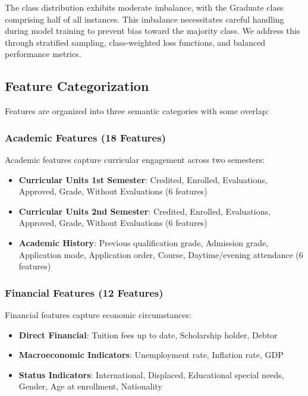 \documentclass[journal]{IEEEtran}
\begin{document}
The class distribution exhibits moderate imbalance, with the Graduate class comprising half of all instances. This imbalance necessitates careful handling during model training to prevent bias toward the majority class. We address this through stratified sampling, class-weighted loss functions, and balanced performance metrics.

\subsection{Feature Categorization}

Features are organized into three semantic categories with some overlap:

\subsubsection{Academic Features (18 Features)}

Academic features capture curricular engagement across two semesters:

\begin{itemize}
\item \textbf{Curricular Units 1st Semester}: Credited, Enrolled, Evaluations, Approved, Grade, Without Evaluations (6 features)
\item \textbf{Curricular Units 2nd Semester}: Credited, Enrolled, Evaluations, Approved, Grade, Without Evaluations (6 features)
\item \textbf{Academic History}: Previous qualification grade, Admission grade, Application mode, Application order, Course, Daytime/evening attendance (6 features)
\end{itemize}

\subsubsection{Financial Features (12 Features)}

Financial features capture economic circumstances:

\begin{itemize}
\item \textbf{Direct Financial}: Tuition fees up to date, Scholarship holder, Debtor
\item \textbf{Macroeconomic Indicators}: Unemployment rate, Inflation rate, GDP
\item \textbf{Status Indicators}: International, Displaced, Educational special needs, Gender, Age at enrollment, Nationality
\end{itemize}
\end{document}
